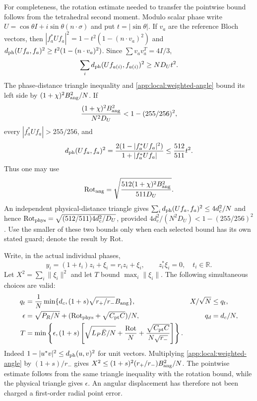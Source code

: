 For completeness, the rotation estimate needed to transfer the pointwise
bound follows from the tetrahedral second moment. Modulo scalar phase
write $U=\cos\theta I+i\sin\theta(n\cdot\sigma)$ and put $t=|\sin\theta|$.
If $v_a$ are the reference Bloch vectors, then
$|f_a^*Uf_a|^2=1-t^2(1-(n\cdot v_a)^2)$ and
$d_{\rm ph}(Uf_a,f_a)^2\ge t^2(1-(n\cdot v_a)^2)$.
Since $\sum v_av_a^T=4I/3$,
\[
 \sum_i d_{\rm ph}(Uf_{a(i)},f_{a(i)})^2\ge ND_Ut^2.
\]
The phase-distance triangle inequality and
\eqref{app:local:weighted-angle} bound its left side by
$(1+\chi)^2B_{\rm ang}^2/N$. If
\begin{equation}\label{app:local:rotation-guard}
 \frac{(1+\chi)^2B_{\rm ang}^2}{N^2D_U}
 <1-(255/256)^2,
\end{equation}
every $|f_a^*Uf_a|>255/256$, and
\[
 d_{\rm ph}(Uf_a,f_a)^2=
 \frac{2(1-|f_a^*Uf_a|^2)}{1+|f_a^*Uf_a|}
 \le\frac{512}{511}t^2.
\]
Thus one may use
\[
 \mathrm{Rot}_{\rm ang}=
 \sqrt{\frac{512(1+\chi)^2B_{\rm ang}^2}{511D_U}}.
\]
An independent physical-distance triangle gives
$\sum_i d_{\rm ph}(Uf_a,f_a)^2\le4d_c^2/N$ and hence
$\mathrm{Rot}_{\rm phys}=\sqrt{(512/511)4d_c^2/D_U}$,
provided $4d_c^2/(N^2D_U)<1-(255/256)^2$.
Use the smaller of these two bounds only when each selected bound has
its own stated guard; denote the result by $\mathrm{Rot}$.

Write, in the actual individual phases,
\begin{equation}\label{app:local:column-split}
 y_i=(1+t_i)z_i+\xi_i=r_i z_i+\xi_i,\qquad
 z_i^*\xi_i=0,\quad t_i\in\mathbb R.
\end{equation}
Let $X^2=\sum_i\|\xi_i\|^2$ and let $T$ bound $\max_i\|\xi_i\|$.
The following simultaneous choices are valid:
\begin{align}
 q_t&=\frac1N\min\{d_c,(1+s)\sqrt{r_+/r_-}B_{\rm ang}\},
 & X/\sqrt N&\le q_t,\label{app:local:tangent-bounds}\\
 \epsilon&=\sqrt{P_R/N}+(\mathrm{Rot}_{\rm phys}+\sqrt{C_{\mathrm{pt}}C})/N,
 & q_d&=d_c/N,\nonumber\\
 T&=\min\left\{\epsilon,(1+s)\left[
 \sqrt{L_P\bar E/N}+\frac{\mathrm{Rot}}N+
 \frac{\sqrt{C_{\mathrm{pt}}C}}{N\sqrt{r_-}}\right]\right\}.&&\nonumber
\end{align}
Indeed $1-|u^*v|^2\le d_{\rm ph}(u,v)^2$ for unit vectors.
Multiplying \eqref{app:local:weighted-angle} by $(1+s)/r_-$ gives
$X^2\le(1+s)^2(r_+/r_-)B_{\rm ang}^2/N$.
The pointwise estimate follows from the same triangle inequality with
the rotation bound, while the physical triangle gives $\epsilon$.
An angular displacement has therefore not been charged a first-order
radial point error.

